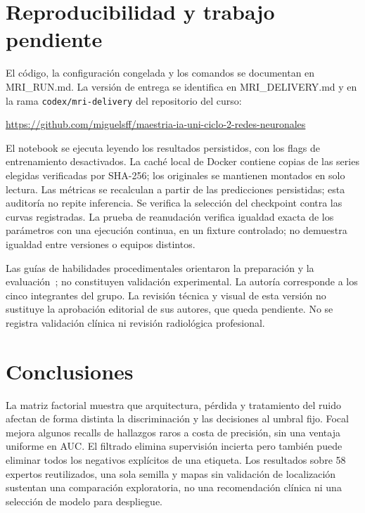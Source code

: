 \section{Reproducibilidad y trabajo pendiente}
El código, la configuración congelada y los comandos se documentan en MRI\_RUN.md.
La versión de entrega se identifica en MRI\_DELIVERY.md y en la rama \texttt{codex/mri-delivery} del repositorio del curso:
\begin{flushleft}
\url{https://github.com/miguelsff/maestria-ia-uni-ciclo-2-redes-neuronales}
\end{flushleft}
El notebook se ejecuta leyendo los resultados persistidos, con los flags de entrenamiento desactivados.
La caché local de Docker contiene copias de las series elegidas verificadas por SHA-256;
los originales se mantienen montados en solo lectura. Las métricas se recalculan a partir de las
predicciones persistidas; esta auditoría no repite inferencia. Se verifica la selección del checkpoint
contra las curvas registradas.
La prueba de reanudación verifica igualdad exacta de los parámetros con una ejecución continua,
en un fixture controlado; no demuestra igualdad entre versiones o equipos distintos.

\FloatBarrier
Las guías de habilidades procedimentales orientaron la preparación y la evaluación~\cite{skills};
no constituyen validación experimental. La autoría corresponde a los cinco integrantes del grupo.
La revisión técnica y visual de esta versión no sustituye la aprobación editorial de sus autores,
que queda pendiente. No se registra validación clínica ni revisión radiológica profesional.
\section{Conclusiones}
La matriz factorial muestra que arquitectura, pérdida y tratamiento del ruido afectan de forma distinta
la discriminación y las decisiones al umbral fijo. Focal mejora algunos recalls de hallazgos raros a costa
de precisión, sin una ventaja uniforme en AUC. El filtrado elimina supervisión incierta pero también puede
eliminar todos los negativos explícitos de una etiqueta. Los resultados sobre 58 expertos reutilizados,
una sola semilla y mapas sin validación de localización sustentan una comparación exploratoria,
no una recomendación clínica ni una selección de modelo para despliegue.
\clearpage
{}
\clearpage



